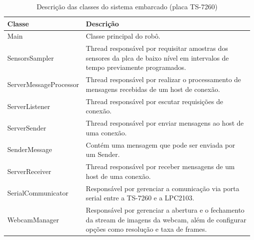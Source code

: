 \begin{table}[h]
  \centering
  \caption{Descrição das classes do sistema embarcado (placa TS-7260)}
  \begin{tabular}{p{6cm}p{8cm}}
    \toprule
    \textbf{Classe} & \textbf{Descrição} \\ 
    \midrule
   Main & Classe principal do robô. \\ \hline
   SensorsSampler & Thread responsável por requisitar amostras dos sensores da plca de baixo nível em intervalos de tempo previamente programados. \\ \hline
   ServerMessageProcessor & Thread responsável por realizar o processamento de mensagens recebidas de um host de conexão. \\ \hline
   ServerListener & Thread responsável por escutar requisições de conexão. \\ \hline
   ServerSender & Thread responsável por enviar mensagens ao host de uma conexão. \\ \hline
   SenderMessage & Contém uma mensagem que pode ser enviada por um Sender. \\ \hline
   ServerReceiver & Thread responsável por receber mensagens de um host de uma conexão. \\ \hline
   SerialCommunicator & Responsável por gerenciar a comunicação via porta serial entre a TS-7260 e a LPC2103.\\ \hline
   WebcamManager & Responsável por gerenciar a abertura e o fechamento da stream de imagens da webcam, além de configurar opções como resolução e taxa de frames. \\
   \bottomrule
  \end{tabular}%
  \label{tab:classes_ts}%
\end{table}%
